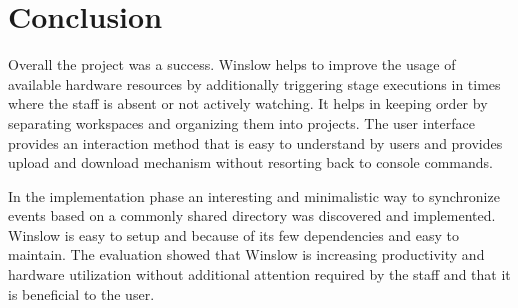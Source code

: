 \chapter{Conclusion}

Overall the project was a success.
Winslow helps to improve the usage of available hardware resources by additionally triggering stage executions in times where the staff is absent or not actively watching.
It helps in keeping order by separating workspaces and organizing them into projects.
The user interface provides an interaction method that is easy to understand by users and provides upload and download mechanism without resorting back to console commands.

In the implementation phase an interesting and minimalistic way to synchronize events based on a commonly shared directory was discovered and implemented.
Winslow is easy to setup and because of its few dependencies and easy to maintain.
The evaluation showed that Winslow is increasing productivity and hardware utilization without additional attention required by the staff and that it is beneficial to the user.